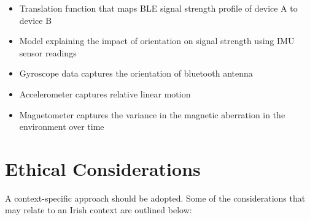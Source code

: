 \documentclass[conference]{IEEEtran}
\begin{document}
\begin{itemize}
\item  Translation function that maps BLE signal strength profile of device A to device B
\item  Model explaining the impact of orientation on signal strength using IMU sensor readings
\item  Gyroscope data captures the orientation of bluetooth antenna
\item  Accelerometer captures relative linear motion
\item  Magnetometer captures the variance in the magnetic aberration in the environment over time
\end{itemize}

\section{Ethical Considerations}
A context-specific approach should be adopted. Some of the considerations that may relate to an Irish context are outlined below: 
\end{document}
